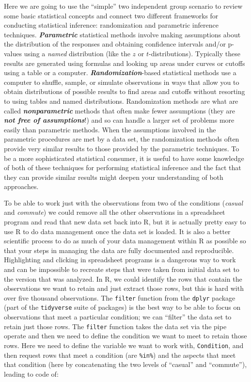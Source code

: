 \documentclass[
]{book}
\begin{document}
\indent Here we are going to use the ``simple'' two independent group scenario to
review some basic statistical concepts and connect two different
frameworks for conducting statistical inference: randomization and
parametric  inference techniques. \textbf{\emph{Parametric}} statistical methods
involve making assumptions
about the distribution of the
responses and obtaining confidence intervals and/or p-values using a
\emph{named} distribution (like the \(z\) or \(t\)-distributions). Typically these
results are generated using formulas and looking up areas under curves or
cutoffs using a table or a computer. \textbf{\emph{Randomization}}-based statistical
methods use a computer to shuffle, sample, or simulate observations in ways
that allow you to obtain distributions of possible results to find areas and
cutoffs without resorting to using tables and named distributions.
Randomization methods are what are called \textbf{\emph{nonparametric}} methods
that often make fewer assumptions (they are \textbf{\emph{not free of assumptions}}!)
and so can handle a larger set of problems more easily than parametric
methods.
When the assumptions involved in the parametric procedures are
met by a data set, the randomization methods often provide very similar
results to those provided by the parametric techniques. To be a more
sophisticated statistical consumer, it is useful to have some knowledge
of both of these techniques for performing statistical inference and the fact that they can provide similar results might deepen your understanding of both
approaches.

\indent To be able to work just with the observations from two of the conditions (\emph{casual} and \emph{commute}) we could remove all the other observations in a spreadsheet program and read that new data set
back into R, but it is actually pretty easy to use R to do data
management once the data set is loaded. It is also a better scientific process to do as much of your data management within R as possible so that your steps in managing the data are fully documented and reproducible. Highlighting and clicking in spreadsheet programs is a dangerous way to work and can be impossible to recreate steps that were taken from initial data set to the version that was analyzed. In R, we could identify the rows that contain the observations we want to retain and just extract those rows, but this is hard with over five thousand observations. The \texttt{filter} function from the \texttt{dplyr} package (part of the \texttt{tidyverse} suite of packages) is the best way to be able to focus on observations that meet a particular condition; we can ``filter'' the data set to retain just those rows. The \texttt{filter} function takes the data set via the pipe operate and then we need to define the condition we want to meet to retain those rows. Here we need to define the variable we want to work with, \texttt{Condition}, and then request rows that meet a condition (are \texttt{\%in\%}) and the aspects that meet that condition (here by concatenating the two levels of ``casual'' and ``commute''), leading to code of: 
\end{document}
